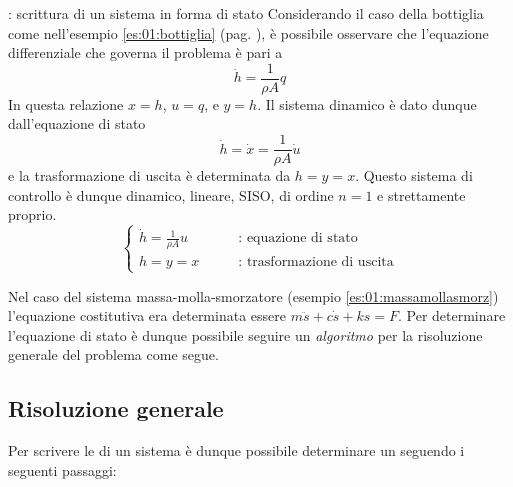  	\begin{esempio}{: scrittura di un sistema in forma di stato}
 		Considerando il caso della bottiglia come nell'esempio \ref{es:01:bottiglia} (pag. \pageref{es:01:bottiglia}), è possibile osservare che l'equazione differenziale che governa il problema è pari a 
 		\[ \dot h = \frac{1}{\rho A} q \]
 		In questa relazione $x=h$, $u=q$, e $y=h$. Il sistema dinamico è dato dunque dall'equazione di stato
 		\[ \dot h = \dot x = \frac{1}{\rho A} \dot u \]
 		e la trasformazione di uscita è determinata da $h = y = x$. Questo sistema di controllo è dunque dinamico, lineare, SISO, di ordine $n=1$ e strettamente proprio.
 		\[ \begin{cases}
 			\dot h = \frac{1}{\rho A} u \qquad & \textrm{: equazione di stato} \\
 			h = y = x \qquad & \textrm{: trasformazione di uscita}
 		\end{cases}\]
 		
 		\vspace{3mm}
 		Nel caso del sistema massa-molla-smorzatore (esempio \ref{es:01:massamollasmorz}) l'equazione costitutiva era determinata essere $m\ddot s +c\dot s + ks = F$. Per determinare l'equazione di stato è dunque possibile seguire un \textit{algoritmo} per la risoluzione generale del problema come segue.
 		
 	\end{esempio}
 
 	
 	\subsection{Risoluzione generale} 
 		
 		Per scrivere le  di un sistema è dunque possibile determinare un  seguendo i seguenti passaggi:
 		
